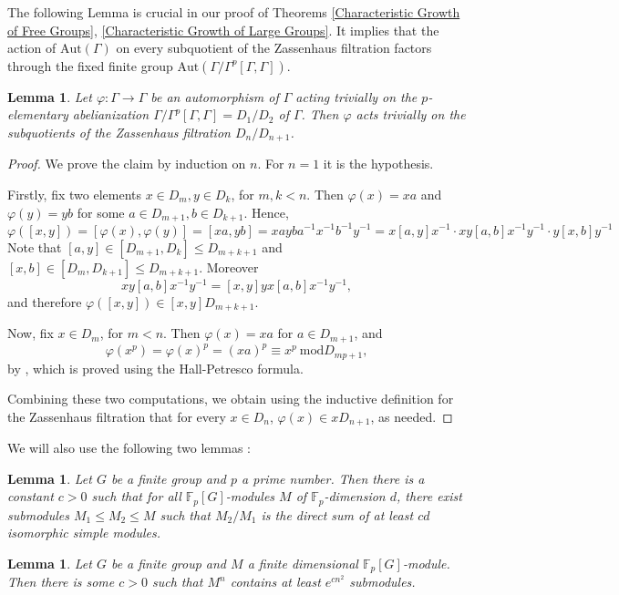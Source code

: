 \documentclass[letterpaper]{amsart}
\newtheorem{lemma}[theorem]{Lemma}
\begin{document}
The following Lemma is crucial in our proof of Theorems \ref{Characteristic Growth of Free Groups}, \ref{Characteristic Growth of Large Groups}. It implies that the action of $\mathrm{Aut}(\Gamma)$ on every subquotient of the Zassenhaus filtration factors through the fixed finite group $\mathrm{Aut}(\Gamma/\Gamma^p[\Gamma,\Gamma]).$
\begin{lemma}
\label{Automorphism Action}
Let $\varphi:\Gamma \to \Gamma$ be an automorphism of $\Gamma$ acting trivially on the $p$-elementary abelianization $\Gamma/\Gamma^p[\Gamma,\Gamma] = D_1 / D_2$ of $\Gamma$. Then $\varphi$ acts trivially on the subquotients of the Zassenhaus filtration $D_n / D_{n + 1}$.
\end{lemma}
\begin{proof}
We prove the claim by induction on $n$. For $n = 1$ it is the hypothesis.

Firstly, fix two elements $x \in D_m, y \in D_k$, for $m,k < n$. Then $\varphi(x) = xa$ and $\varphi(y) = yb$ for some $a \in D_{m + 1}, b \in D_{k + 1}$. Hence,
    $$\varphi([x, y]) = [\varphi(x),\varphi(y)] = [xa, yb] = xayba^{-1}x^{-1}b^{-1}y^{-1} = x[a,y]x^{-1} \cdot xy [a, b] x^{-1}y^{-1} \cdot y[x, b]y^{-1}$$
Note that $[a,y] \in [D_{m+1}, D_k] \leq D_{m + k + 1}$ and $[x, b] \in [D_m, D_{k + 1}] \leq D_{m + k + 1}$. Moreover $$xy[a,b]x^{-1}y^{-1} = [x,y] yx[a,b]x^{-1}y^{-1},$$and therefore $\varphi([x,y]) \in [x,y] D_{m + k + 1}$.

Now, fix $x \in D_m$, for $m < n$. Then $\varphi(x) = xa$ for $a \in D_{m + 1}$, and
$$\varphi(x^p) = \varphi(x)^p = (xa)^p \equiv x^p \ \mathrm{mod} D_{mp+1},$$ by \cite[Corollary 11.10 part ii]{dixon2003analytic}, which is proved using the Hall-Petresco formula.

Combining these two computations, we obtain using the inductive definition for the Zassenhaus filtration that for every $x \in D_n$, $\varphi(x) \in xD_{n + 1}$, as needed.
\end{proof}
We will also use the following two lemmas \cite[Lemma 9, Lemma 10]{barnea2020large}:
\begin{lemma}
    Let $G$ be a finite group and $p$ a prime number. Then there is a constant $c > 0$ such that for all $\mathbb{F}_p[G]$-modules $M$ of $\mathbb{F}_p$-dimension $d$, there exist submodules $M_1 \leq M_2 \leq M$ such that $M_2 / M_1$ is the direct sum of at least $cd$ isomorphic simple modules.
\end{lemma}
\begin{lemma}
    Let $G$ be a finite group and $M$ a finite dimensional $\mathbb{F}_p[G]$-module. Then there is some $c>0$ such that $M^n$ contains at least $e^{cn^2}$ submodules.
\end{lemma}
\end{document}
